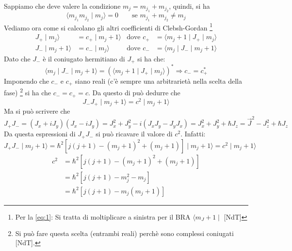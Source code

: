 Sappiamo che deve valere la condizione $m_{j}= m_{j_{1}} + m_{j_{2}}$, quindi,
si ha
\begin{equation}
\langle m_{j_{1}} m_{j_{2}} \mid m_{j} \rangle = 0 \quad \quad \text{se $m_{j_{1}} + m_{j_{2}} \neq m_{j}$}
\end{equation}
Vediamo ora come si calcolano gli altri coefficienti di Clebsh-Gordan
\footnote{Per la \eqref{eq:1}: Si tratta di moltiplicare a sinistra per il BRA
$\langle m_J + 1 \mid$ [NdT]}
\begin{align}
\label{eq:1}
J_{+} \mid m_{j} \rangle &= c_{+} \mid m_{j} + 1 \rangle & \text{dove } c_{+} &= \langle m_{j} +1 \mid J_{+} \mid m_{j} \rangle \\
J_{-} \mid m_{j} +1 \rangle &= c_{-} \mid m_{j} \rangle & \text{dove } c_{-} &= \langle m_{j} \mid J_{-} \mid m_{j} +1 \rangle 
\end{align}
Dato che $J_{-}$ è il coniugato hermitiano di $J_{+}$ si ha che:
\begin{equation}
\langle m_{j} \mid J_{-} \mid m_{j} +1 \rangle = \left( \langle m_{j} +1 \mid J_{+} \mid m_{j} \rangle \right) ^{*} \Rightarrow c_{-} = c_{+} ^{*}
\end{equation}
Imponendo che $c_{-}$ e $c_{+}$ siano reali (c'è sempre una arbitrarietà nella
scelta della fase) \footnote{Si può fare questa scelta (entrambi reali) perchè
sono complessi coniugati [NdT].} si ha che $c_{-} = c_{+} = c$. Da questo di
può dedurre che
\begin{equation}
J_{-}J_{+} \mid m_{j} + 1 \rangle = c^{2} \mid m_{j} + 1 \rangle
\end{equation}
Ma si può scrivere che
\begin{equation}
J_{+}J_{-} = \left( J_{x} + iJ_{y} \right)\left( J_{x} - iJ_{y} \right) = J_{x}^{2}  + J_{y}^{2} - i\left(J_{x}J_{y} - J_{y}J_{x} \right) = J_{x}^{2}  + J_{y}^{2} + \hbar J_{z} = \vec{J}^{2} - J_{z} ^{2} + \hbar J_{z}
\end{equation}
Da questa espressioni di $J_{+}J_{-}$ si può ricavare il valore di $c^{2}$.
Infatti:
\begin{equation}
J_{+}J_{-} \mid m_{j} +1 \rangle = \hbar ^{2} \left[j\left(j+1\right) -
\left(m_{j} +1\right)^{2} + \left(m_{j} + 1 \right) \right] \mid m_{j} + 1
\rangle = c^{2}\mid m_{j} +1 \rangle
\end{equation}
\begin{equation}
\begin{split}
c^{2} &= \hbar ^{2}  \left[j\left(j+1\right) - \left(m_{j} +1\right)^{2} +
\left(m_{j} + 1 \right) \right] \\
&= \hbar ^{2} \left[ j\left(j+1\right) - m_{j}^{2} - m_{j}\right] \\
&= \hbar ^{2} \left[j\left(j+1\right) - m_{j}\left(m_{j} +1\right)\right]
\end{split}
\end{equation}
